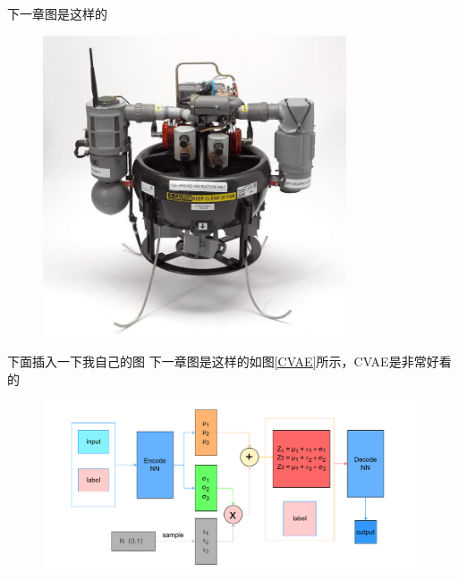 下一章图是这样的
\begin{figure}[htbp]
	\centering
	\includegraphics[width=0.8\textwidth]{Fig/honeywell_t-hawk.jpg}
	\caption{\label{pic3}}
\end{figure}

下面插入一下我自己的图
下一章图是这样的如图\ref{CVAE}所示，CVAE是非常好看的
\begin{figure}[htbp]
	\centering
	\includegraphics[width=\textwidth]{Fig/CVAE示意图.drawio.pdf}
\end{figure}


